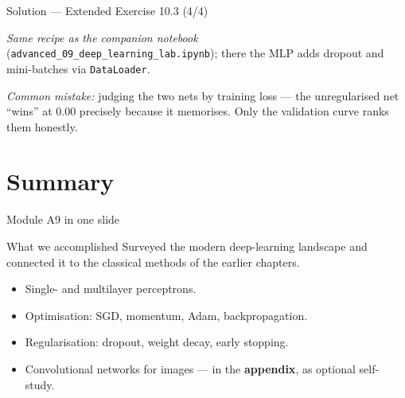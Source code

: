 \documentclass[aspectratio=169,11pt]{beamer}
\begin{document}
\begin{frame}{Solution --- Extended Exercise 10.3 (4/4)}
\begin{solutionbox}
  \textit{Same recipe as the companion notebook} (\texttt{advanced\_09\_deep\_learning\_lab.ipynb});
  there the MLP adds dropout and mini-batches via \texttt{DataLoader}.

  \smallskip
  \textit{Common mistake:} judging the two nets by training loss --- the
  unregularised net ``wins'' at $0.00$ precisely because it memorises.
  Only the validation curve ranks them honestly.
\end{solutionbox}
\end{frame}

\section{Summary}

\begin{frame}{Module A9 in one slide}
  \begin{block}{What we accomplished}
    Surveyed the modern deep-learning landscape and connected it to
    the classical methods of the earlier chapters.
  \end{block}
  \begin{itemize}
    \item Single- and multilayer perceptrons.
    \item Optimisation: SGD, momentum, Adam, backpropagation.
    \item Regularisation: dropout, weight decay, early stopping.
    \item Convolutional networks for images --- in the \textbf{appendix},
          as optional self-study.
  \end{itemize}
\end{frame}
\end{document}
